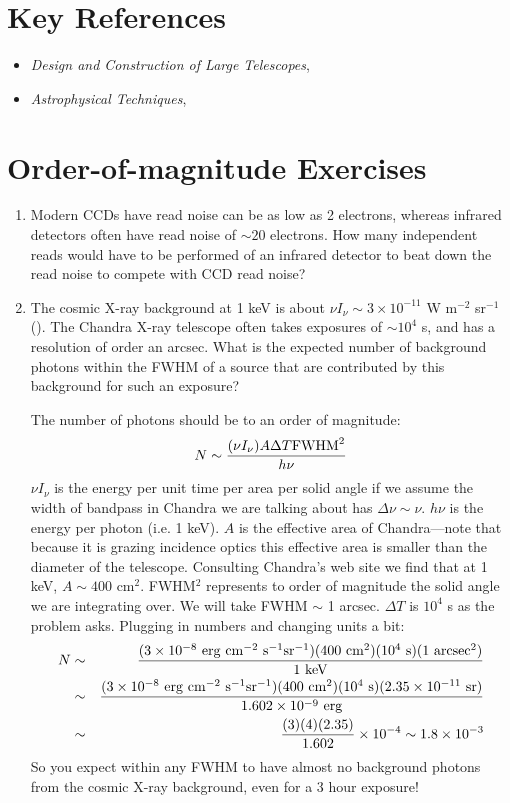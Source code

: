\section{Key References}

\begin{itemize}
  \item
    {\it Design and Construction of Large Telescopes},
      \citet{bely03a}
  \item
    {\it Astrophysical Techniques},
      \citet{kitchin09a}
\end{itemize}

\section{Order-of-magnitude Exercises}

\begin{enumerate} 
\item Modern CCDs have read noise can be as low as 2 electrons,
    whereas infrared detectors often have read noise of $\sim 20$
    electrons. How many independent reads would have to be performed
    of an infrared detector to beat down the read noise to compete
    with CCD read noise?
\item The cosmic X-ray background at 1 keV is about $\nu I_\nu \sim
    3\times 10^{-11}$
    W m$^{-2}$ sr$^{-1}$ (\citealt{fabian92a}). The Chandra X-ray
    telescope often takes exposures of $\sim 10^4$ s, and has a
    resolution of order an arcsec. What is the expected number of
    background photons within the FWHM of a source that are
    contributed by this background for such an exposure?
\begin{answer}[]
The number of photons should be to an order of magnitude:
\begin{equation}
N \sim \frac{(\nu I_\nu) A \Delta T {\rm FWHM}^2}{h\nu}
\end{equation}
$\nu I_\nu$ is the energy per unit time per area per solid angle if we
assume the width of bandpass in Chandra we are talking about has
$\Delta \nu \sim \nu$. $h\nu$ is the energy per photon (i.e. 1 keV).
$A$ is the effective area of Chandra---note that because it is grazing
incidence optics this effective area is smaller than the diameter of
the telescope. Consulting Chandra's web site we find that at 1 keV,
$A\sim 400$ cm$^2$.  FWHM$^2$ represents to order of magnitude the
solid angle we are integrating over. We will take FWHM $\sim$ 1
arcsec.  $\Delta T$ is $10^4$ s as the problem asks.
Plugging in numbers and changing units a bit:
\begin{eqnarray}
N &\sim& \frac{(3\times 10^{-8} {\rm ~erg} {\rm ~cm}^{-2} {\rm ~s}^{-1}
{\rm sr}^{-1}) (400 {\rm ~cm}^2) (10^4 {\rm ~s}) (1 {\rm
~arcsec}^2)}{1 {\rm ~keV}}\cr
&\sim& \frac{(3\times 10^{-8} {\rm ~erg} {\rm ~cm}^{-2} {\rm ~s}^{-1}
{\rm sr}^{-1}) (400 {\rm ~cm}^2) (10^4 {\rm ~s}) (2.35\times 10^{-11} {\rm
~sr})}{1.602\times 10^{-9} {\rm ~erg}}\cr
&\sim& \frac{(3) (4) (2.35)}{1.602} \times 10^{-4} \sim 1.8 \times
10^{-3}
\end{eqnarray}
So you expect within any FWHM to have almost no background photons
from the cosmic X-ray background, even for a 3 hour exposure!
\end{answer}


\end{enumerate}
